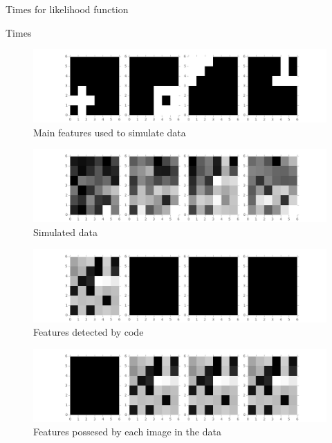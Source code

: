 \documentclass[11pt]{article}
\begin{document}

\begin{table}[ht]
\centering
\caption{Times for likelihood function \label{time_like}}

\end{table}

\begin{table}[ht]
\centering
\caption{Times \label{time}}

\end{table}

\begin{figure}
\includegraphics[width=\linewidth]{data_files/features.png}
\caption {Main features used to simulate data}
\label{fig:feat}
\end{figure}

\begin{figure}
\includegraphics[width=\linewidth]{data_files/data.png}
\caption {Simulated data}
\label{fig:data}
\end{figure}

\begin{figure}
\includegraphics[width=\linewidth]{data_files/detected_features.png}
\caption {Features detected by code}
\label{fig:dat}
\end{figure}

\begin{figure}
\includegraphics[width=\linewidth]{data_files/detected_total_features.png}
\caption {Features possesed by each image in the data}
\label{fig:da}
\end{figure}
\end{document}
